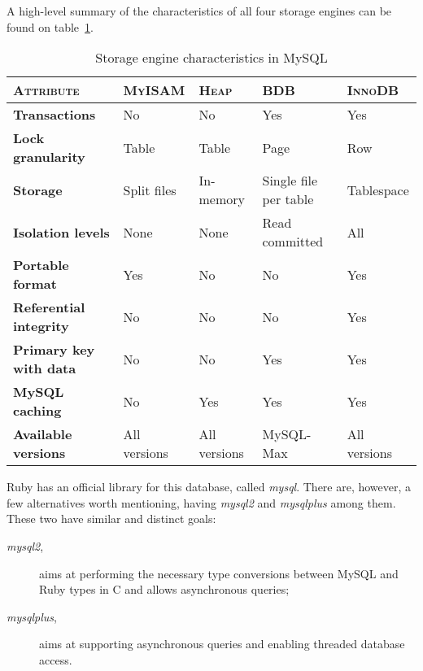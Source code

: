 A high-level summary of the characteristics of all four storage engines can be found on table~\ref{tab:storage_engines_mysql}.
\begin{table}[ht]
  \centering
  
  \begin{tabular}{p{4cm}|p{2cm}|p{2cm}|p{3cm}|p{2cm}}
    \textsc{Attribute}
  & \textsc{MyISAM}
  & \textsc{Heap}
  & \textsc{BDB}
  & \textsc{InnoDB} \\
  \hline

    \textbf{Transactions}
  & No
  & No
  & Yes
  & Yes \\

  \hline
    \textbf{Lock granularity}
  & Table
  & Table
  & Page
  & Row \\

  \hline
    \textbf{Storage}
  & Split files
  & In-memory
  & Single file per table
  & Tablespace \\

  \hline
    \textbf{Isolation levels}
  & None
  & None
  & Read committed
  & All \\

  \hline
    \textbf{Portable format}
  & Yes
  & No
  & No
  & Yes \\

  \hline
    \textbf{Referential integrity}
  & No
  & No
  & No
  & Yes \\

  \hline
    \textbf{Primary key with data}
  & No
  & No
  & Yes
  & Yes \\
    
  \hline
    \textbf{MySQL caching}
  & No
  & Yes
  & Yes
  & Yes \\

  \hline
    \textbf{Available versions}
  & All versions
  & All versions
  & MySQL-Max
  & All versions \\
  \end{tabular}
  \caption{Storage engine characteristics in MySQL}
  \label{tab:storage_engines_mysql}
\end{table}
Ruby has an official library for this database, called \textit{mysql}. There are, however, a few alternatives worth mentioning, having \textit{mysql2} and \textit{mysqlplus} among them. These two have similar and distinct goals:
\begin{description}
  \item[\textit{mysql2},] aims at performing the necessary type conversions between MySQL and Ruby types in C and allows asynchronous queries;
  \item[\textit{mysqlplus},] aims at supporting asynchronous queries and enabling threaded database access.
\end{description}

